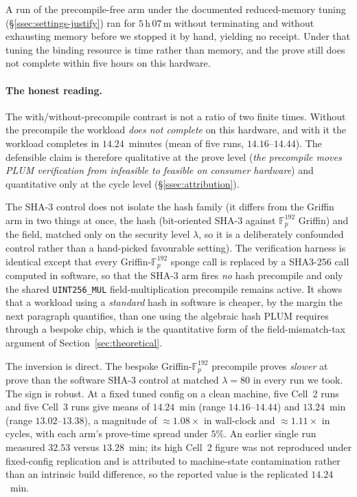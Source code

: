 A run of the precompile-free arm under the documented reduced-memory tuning (\S\ref{ssec:settings-justify}) ran for $5$\,h\,$07$\,m without terminating and without exhausting memory before we stopped it by hand, yielding no receipt. Under that tuning the binding resource is time rather than memory, and the prove still does not complete within five hours on this hardware.

\paragraph{The honest reading.}
The with/without-precompile contrast is not a ratio of two finite times. Without the precompile the workload \emph{does not complete} on this hardware, and with it the workload completes in $14.24$~minutes (mean of five runs, $14.16$--$14.44$). The defensible claim is therefore qualitative at the prove level (\emph{the precompile moves PLUM verification from infeasible to feasible on consumer hardware}) and quantitative only at the cycle level (\S\ref{ssec:attribution}).

The SHA-3 control does not isolate the hash family (it differs from the Griffin arm in two things at once, the hash (bit-oriented SHA-3 against $\mathbb{F}_p^{192}$ Griffin) and the field, matched only on the security level $\lambda$, so it is a deliberately confounded control rather than a hand-picked favourable setting). The verification harness is identical except that every Griffin-$\mathbb{F}_p^{192}$ sponge call is replaced by a SHA3-256 call computed in software, so that the SHA-3 arm fires \emph{no} hash precompile and only the shared \texttt{UINT256\_MUL} field-multiplication precompile remains active. It shows that a workload using a \emph{standard} hash in software is cheaper, by the margin the next paragraph quantifies, than one using the algebraic hash PLUM requires through a bespoke chip, which is the quantitative form of the field-mismatch-tax argument of Section~\ref{sec:theoretical}.

The inversion is direct. The bespoke Griffin-$\mathbb{F}_p^{192}$ precompile proves \emph{slower} at prove than the software SHA-3 control at matched $\lambda=80$ in every run we took. The sign is robust. At a fixed tuned config on a clean machine, five Cell~2 runs and five Cell~3 runs give means of $14.24$~min (range $14.16$--$14.44$) and $13.24$~min (range $13.02$--$13.38$), a magnitude of ${\approx}1.08\times$ in wall-clock and ${\approx}1.11\times$ in cycles, with each arm's prove-time spread under $5\%$. An earlier single run measured $32.53$ versus $13.28$~min; its high Cell~2 figure was not reproduced under fixed-config replication and is attributed to machine-state contamination rather than an intrinsic build difference, so the reported value is the replicated $14.24$~min.

